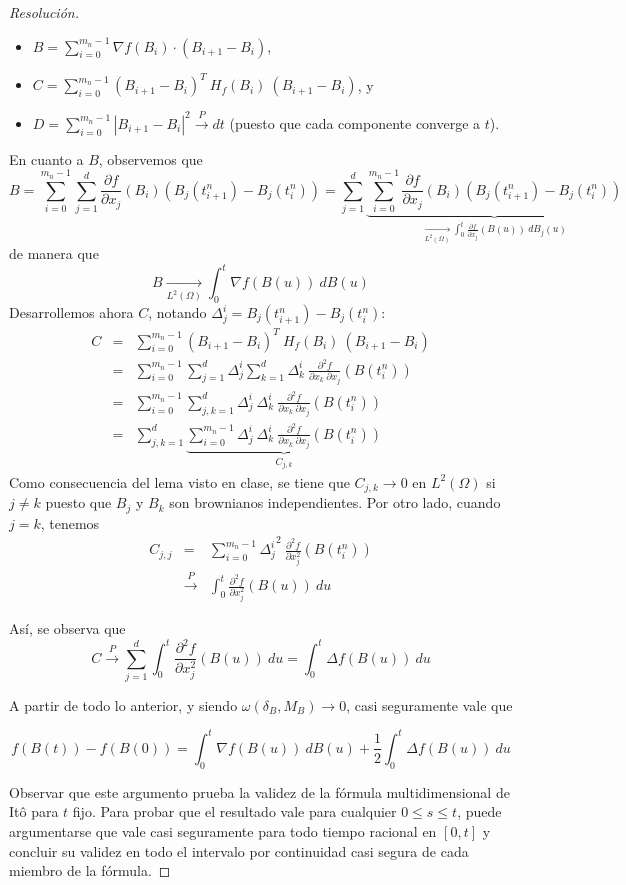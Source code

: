 \documentclass[a4paper,11pt]{article}
\newcommand{\abs}[1]{\ensuremath{\left\lvert #1 \right\rvert}}
\newcommand{\Grad}[1]{\nabla #1}
\newcommand{\Lap}[1]{\Delta #1 }
\newcommand{\Dif}[1]{d #1}
\newcommand{\IntBu}[1]{\int_0^t{#1~\Dif{B(u)}}}
\newcommand{\IntBju}[1]{\int_0^t{#1~\Dif{B_j(u)}}}
\newcommand{\Der}[2]{\frac{\partial f}{\partial x_{#1}}(#2)}
\newcommand{\DerS}[3]{\frac{\partial^2 f}{\partial x_{#1} ~\partial x_{#2}}(#3)}
\newcommand{\DerSE}[2]{\frac{\partial^2 f}{\partial x_{#1}^2}(#2)}
\begin{document}
\begin{proof}[Resoluci\'on]
\begin{itemize}
    \item $B = \displaystyle \sum_{i = 0}^{m_n - 1}{\Grad{f(B_i)} \cdot (B_{i+1} - B_i)}$,

    \item $C = \displaystyle \sum_{i = 0}^{m_n - 1}{(B_{i+1} - B_i)^T ~ H_f(B_i) ~ (B_{i+1} - B_i)}$, y

    \item $D = \displaystyle \sum_{i = 0}^{m_n - 1}{\abs{B_{i+1} - B_i}^2} \overset{P}{\longrightarrow} dt$ (puesto que cada componente
    converge a $t$).
\end{itemize}

En cuanto a $B$, observemos que 
$$B  = \sum_{i = 0}^{m_n - 1}{\sum_{j = 1}^{d}{\Der{j}{B_i} (B_j(t_{i+1}^n) - B_j(t_i^n))}} 
     = \sum_{j = 1}^{d}{\underbrace{\sum_{i = 0}^{m_n - 1}{\Der{j}{B_i} (B_j(t_{i+1}^n) - B_j(t_i^n))}}_{ \underset{L^2(\Omega)}{\longrightarrow} \IntBju{\Der{j}{B(u)}}} }$$
de manera que
$$B \underset{L^2(\Omega)}{\longrightarrow} \IntBu{\Grad{f(B(u))}}$$
Desarrollemos ahora $C$, notando $\Delta_j^i = B_j(t_{i+1}^n) - B_j(t_i^n)$:
\begin{eqnarray*}
    C &=& \sum_{i = 0}^{m_n - 1}{(B_{i+1} - B_i)^T ~ H_f(B_i) ~ (B_{i+1} - B_i)} \\
    &=& \sum_{i = 0}^{m_n - 1}{ \sum_{j=1}^{d}{\Delta_j^i \sum_{k=1}^{d}{ \Delta_k^i ~\DerS{k}{j}{B(t_i^n)}} }  } \\
    &=& \sum_{i = 0}^{m_n - 1}{\sum_{j,k=1}^{d}{\Delta_j^i ~ \Delta_k^i ~\DerS{k}{j}{B(t_i^n)}}} \\
    &=& \sum_{j,k=1}^{d}{\underbrace {\sum_{i = 0}^{m_n - 1}{\Delta_j^i ~ \Delta_k^i ~\DerS{k}{j}{B(t_i^n)}}}_{C_{j,k}}}
\end{eqnarray*}
Como consecuencia del lema visto en clase, se tiene que $C_{j,k} \to 0$ en $L^2(\Omega)$ si $j \neq k$ puesto que 
$B_j$ y $B_k$ son brownianos independientes. Por otro lado, cuando $j = k$, tenemos
\begin{eqnarray*}
    C_{j,j} &=& \sum_{i = 0}^{m_n - 1}{{\Delta_j^i}^2 ~\DerSE{j}{B(t_i^n)}} \\
    &\overset{P}{\longrightarrow}& \int_0^t{\DerSE{j}{B(u)} ~du}
\end{eqnarray*}

Así, se observa que
$$C \overset{P}{\longrightarrow} \sum_{j=1}^{d}{\int_0^t{\DerSE{j}{B(u)} ~du}} = \int_0^t{\Lap{f(B(u))} ~\Dif{u}}$$

A partir de todo lo anterior, y siendo $\omega(\delta_B, M_B) \to 0$, casi seguramente
vale que

$$f(B(t)) - f(B(0)) = \int_0^t{\Grad{f(B(u))} ~\Dif{B(u)}} + \frac{1}{2} \int_0^t{\Lap{f(B(u))} ~\Dif{u}}$$

Observar que este argumento prueba la validez de la fórmula multidimensional de Itô para $t$ fijo. Para probar que el resultado
vale para cualquier $0 \leq s \leq t$, puede argumentarse que vale casi seguramente para todo tiempo racional en $[0,t]$ y 
concluir su validez en todo el intervalo por continuidad casi segura de cada miembro de la fórmula.
\end{proof}
\end{document}
